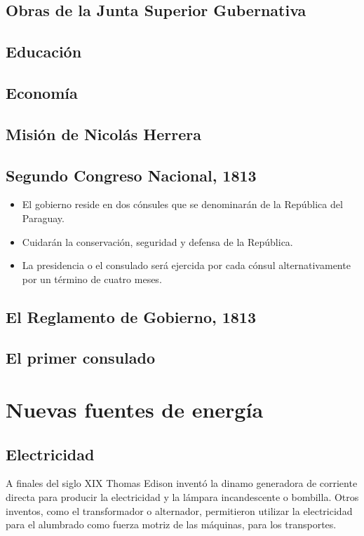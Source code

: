 \documentclass{article}
\begin{document}
{  \subsection*{Obras de la Junta Superior Gubernativa}
  \subsection*{Educación}
  \subsection*{Economía}
  \subsection*{Misión de Nicolás Herrera}
  \subsection*{Segundo Congreso Nacional, 1813}
  \begin{itemize}
    \item El gobierno reside en dos cónsules que se denominarán de la República del Paraguay.
    \item Cuidarán la conservación, seguridad y defensa de la República.
    \item La presidencia o el consulado será ejercida por cada cónsul alternativamente por un término de cuatro meses.
  \end{itemize}
  \subsection*{El Reglamento de Gobierno, 1813}
  \subsection*{El primer consulado}






  \section*{\large Nuevas fuentes de energía}
  \subsection*{\normalsize Electricidad}
  A finales del siglo XIX Thomas Edison inventó la dinamo generadora de corriente directa para producir la electricidad y la lámpara incandescente o bombilla.
  Otros inventos, como el transformador o alternador, permitieron utilizar la electricidad para el alumbrado como fuerza motriz de las máquinas, para los transportes.

}
\end{document}

